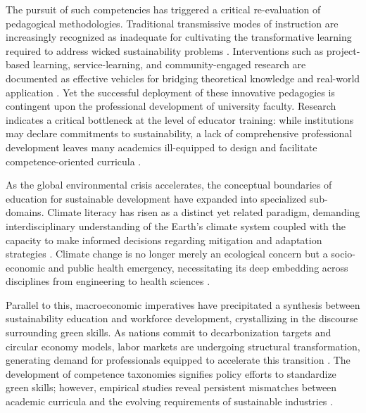 \documentclass[pdflatex,sn-basic]{sn-jnl}%
\begin{document}
The pursuit of such competencies has triggered a critical re-evaluation of pedagogical methodologies. Traditional transmissive modes of instruction are increasingly recognized as inadequate for cultivating the transformative learning required to address wicked sustainability problems \cite{hedden_teaching_2017, sundman_experiential_2025}. Interventions such as project-based learning, service-learning, and community-engaged research are documented as effective vehicles for bridging theoretical knowledge and real-world application \cite{johan_industrial_2016, aigbe_adaptive_2025, mangalore_developing_2025, chien_evaluating_2025}. Yet the successful deployment of these innovative pedagogies is contingent upon the professional development of university faculty. Research indicates a critical bottleneck at the level of educator training: while institutions may declare commitments to sustainability, a lack of comprehensive professional development leaves many academics ill-equipped to design and facilitate competence-oriented curricula \cite{batorczak_education_2020, singer-brodowski_what_2026}.

As the global environmental crisis accelerates, the conceptual boundaries of education for sustainable development have expanded into specialized sub-domains. Climate literacy has risen as a distinct yet related paradigm, demanding interdisciplinary understanding of the Earth's climate system coupled with the capacity to make informed decisions regarding mitigation and adaptation strategies \cite{limaye_developing_2020, lay_climate_2016}. Climate change is no longer merely an ecological concern but a socio-economic and public health emergency, necessitating its deep embedding across disciplines from engineering to health sciences \cite{fuertes_climate_2020, szczepankiewicz_conceptual_2021, garcia-vinuesa_representation_2020, phiri_climate_2025}.

Parallel to this, macroeconomic imperatives have precipitated a synthesis between sustainability education and workforce development, crystallizing in the discourse surrounding green skills. As nations commit to decarbonization targets and circular economy models, labor markets are undergoing structural transformation, generating demand for professionals equipped to accelerate this transition \cite{branca_skills_2022, da_costa_addressing_2025, mukhtar_quantitative_2022, storonyanska_redesigning_2025}. The development of competence taxonomies signifies policy efforts to standardize green skills; however, empirical studies reveal persistent mismatches between academic curricula and the evolving requirements of sustainable industries \cite{garcia_hernandez_structural_2025, barna_integrating_2022, ah-lian_education_2019, yang_improving_2026}.
\end{document}

